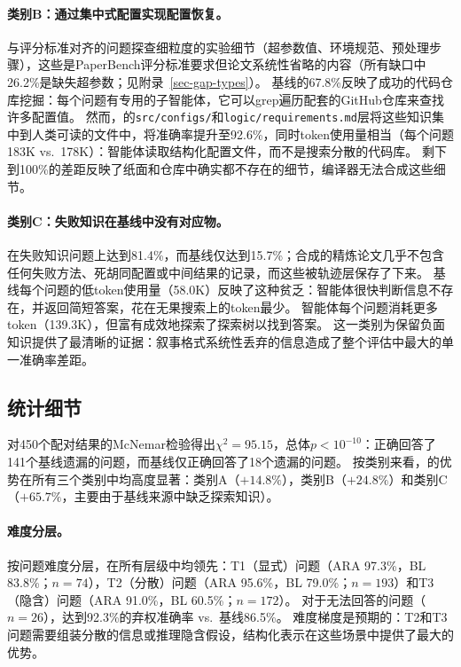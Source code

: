 \paragraph{类别B：通过集中式配置实现配置恢复。}
与评分标准对齐的问题探查细粒度的实验细节（超参数值、环境规范、预处理步骤），这些是PaperBench评分标准要求但论文系统性省略的内容（所有缺口中26.2\%是缺失超参数；见附录~\ref{sec-gap-types}）。
基线的67.8\%反映了成功的代码仓库挖掘：每个问题有专用的子智能体，它可以grep遍历配套的GitHub仓库来查找许多配置值。
然而，\ara{}的\texttt{src/configs/}和\texttt{logic/requirements.md}层将这些知识集中到人类可读的文件中，将准确率提升至92.6\%，同时token使用量相当（每个问题183K vs.\ 178K）：智能体读取结构化配置文件，而不是搜索分散的代码库。
剩下到100\%的差距反映了纸面和仓库中确实都不存在的细节，编译器无法合成这些细节。

\paragraph{类别C：失败知识在基线中没有对应物。}
\ara{}在失败知识问题上达到81.4\%，而基线仅达到15.7\%；合成的精炼论文几乎不包含任何失败方法、死胡同配置或中间结果的记录，而这些被轨迹层保存了下来。
基线每个问题的低token使用量（58.0K）反映了这种贫乏：智能体很快判断信息不存在，并返回简短答案，花在无果搜索上的token最少。
\ara{}智能体每个问题消耗更多token（139.3K），但富有成效地探索了探索树以找到答案。
这一类别为保留负面知识提供了最清晰的证据：叙事格式系统性丢弃的信息造成了整个评估中最大的单一准确率差距。

\subsection{统计细节}
\label{sec-understanding-stats}

对450个配对结果的McNemar检验得出$\chi^2 = 95.15$，总体$p < 10^{-10}$：\ara{}正确回答了141个基线遗漏的问题，而基线仅正确回答了18个\ara{}遗漏的问题。
按类别来看，\ara{}的优势在所有三个类别中均高度显著：类别A（$+14.8\%$），类别B（$+24.8\%$）和类别C（$+65.7\%$，主要由于基线来源中缺乏探索知识）。

\paragraph{难度分层。}
按问题难度分层，\ara{}在所有层级中均领先：T1（显式）问题（ARA 97.3\%，BL 83.8\%；$n = 74$），T2（分散）问题（ARA 95.6\%，BL 79.0\%；$n = 193$）和T3（隐含）问题（ARA 91.0\%，BL 60.5\%；$n = 172$）。
对于无法回答的问题（$n = 26$），\ara{}达到92.3\%的弃权准确率 vs.\ 基线86.5\%。
难度梯度是预期的：T2和T3问题需要组装分散的信息或推理隐含假设，结构化表示在这些场景中提供了最大的优势。

